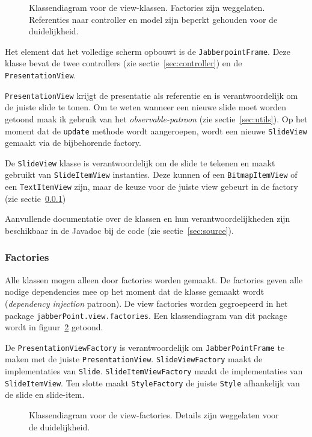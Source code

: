\documentclass[a4paper]{article}
\newcommand{\code}[1]{\lstinline[columns=fixed]{#1}}
\newcommand{\diagram}[3][1.3]{
	\begin{figure}[!htb]
	 \caption{#3}
	 \label{diagram:#2}
	 \makebox[\textwidth][c]{\texttt{[image: Diagrams/\#2.pdf]}}%
	\end{figure}
}
\begin{document}
		\diagram{view}{
			Klassendiagram voor de view-klassen.
			Factories zijn weggelaten.
			Referenties naar controller en model zijn beperkt gehouden voor de duidelijkheid.
		}

		Het element dat het volledige scherm opbouwt is de \code{JabberpointFrame}.
		Deze klasse bevat de twee controllers (zie sectie~\ref{sec:controller}) en de \code{PresentationView}.

		\code{PresentationView} krijgt de presentatie als referentie en is verantwoordelijk om de juiste slide te tonen.
		Om te weten wanneer een nieuwe slide moet worden getoond maak ik gebruik van het \textit{observable-patroon} (zie sectie~\ref{sec:utils}).
		Op het moment dat de \code{update} methode wordt aangeroepen, wordt een nieuwe \code{SlideView} gemaakt via de bijbehorende factory.

		De \code{SlideView} klasse is verantwoordelijk om de slide te tekenen en maakt gebruikt van \code{SlideItemView} instanties.
		Deze kunnen of een \code{BitmapItemView} of een \code{TextItemView} zijn, maar de keuze voor de juiste view gebeurt in de factory (zie sectie~\ref{sec:view-factories})

		Aanvullende documentatie over de klassen en hun verantwoordelijkheden zijn beschikbaar in de Javadoc bij de code (zie sectie~\ref{sec:source}).

		\subsubsection{Factories}\label{sec:view-factories}
			Alle klassen mogen alleen door factories worden gemaakt.
			De factories geven alle nodige dependencies mee op het moment dat de klasse gemaakt wordt (\textit{dependency injection} patroon).
			De view factories worden gegroepeerd in het package \code{jabberPoint.view.factories}.
			Een klassendiagram van dit package wordt in figuur~\ref{diagram:view-factories} getoond.

			De \code{PresentationViewFactory} is verantwoordelijk om \code{JabberPointFrame} te maken met de juiste \code{PresentationView}.
			\code{SlideViewFactory} maakt de implementaties van \code{Slide}.
			\code{SlideItemViewFactory} maakt de implementaties van \code{SlideItemView}.
			Ten slotte maakt \code{StyleFactory} de juiste \code{Style} afhankelijk van de slide en slide-item.

			\diagram{view-factories}{
				Klassendiagram voor de view-factories.
				Details zijn weggelaten voor de duide\-lijk\-heid.
			}
\end{document}
